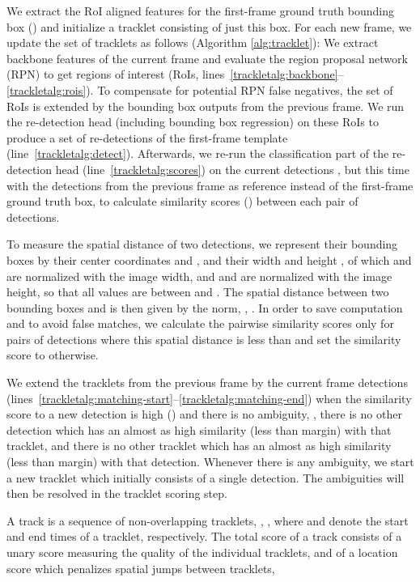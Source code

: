 \documentclass[10pt,twocolumn,letterpaper]{article}
\newcommand{\PAR}[1]{\vskip1pt \noindent {\bf #1~}}
\begin{document}
\PAR{Tracklet Building.}
We extract the RoI aligned features for the first-frame ground truth bounding box () and initialize a tracklet consisting of just this box. For each new frame, we update the set of tracklets as follows (\cf Algorithm \ref{alg:tracklet}):
We extract backbone features of the current frame and evaluate the region proposal network (RPN) to get regions of interest (RoIs, lines~\ref{trackletalg:backbone}--\ref{trackletalg:rois}). To compensate for potential RPN false negatives, the set of RoIs is extended by the bounding box outputs from the previous frame. We run the re-detection head (including bounding box regression) on these RoIs to produce a set of re-detections of the first-frame template (line~\ref{trackletalg:detect}).
Afterwards, we re-run the classification part of the re-detection head (line~\ref{trackletalg:scores}) on the current detections , but this time with the detections  from the previous frame as reference instead of the first-frame ground truth box, to calculate similarity scores () between each pair of detections.

To measure the spatial distance of two detections, we represent their bounding boxes by their center coordinates  and , and their width  and height , of which  and  are normalized with the image width, and  and  are normalized with the image height, so that all values are between  and . The spatial distance between two bounding boxes  and  is then given by the  norm, \ie, . In order to save computation and to avoid false matches, we calculate the pairwise similarity scores only for pairs of detections where this spatial distance is less than  and set the similarity score to  otherwise.

We extend the tracklets from the previous frame by the current frame detections (lines~\ref{trackletalg:matching-start}--\ref{trackletalg:matching-end}) when the similarity score to a new detection is high () and there is no ambiguity, \ie, there is no other detection which has an almost as high similarity (less than  margin) with that tracklet, and there is no other tracklet which has an almost as high similarity (less than  margin) with that detection.
Whenever there is any ambiguity, we start a new tracklet which initially consists of a single detection. The ambiguities will then be resolved in the tracklet scoring step.

\PAR{Scoring.}
A track  is a sequence of  non-overlapping tracklets, \ie, , where  and  denote the start and end times of a tracklet, respectively.
The total score of a track consists of a unary score measuring the quality of the individual tracklets, and of a location score which penalizes spatial jumps between tracklets, \ie
\vspace{-4pt}
\end{document}
